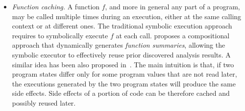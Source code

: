 \begin{itemize}

\item {\em Function caching.} A function $f$, and more in general any part of a program, may be called multiple times during an execution, either at the same calling context or at different ones. The traditional symbolic execution approach requires to symbolically execute $f$ at each call. \cite{G-POPL07} proposes a compositional approach that dynamically generates {\em function summaries}, allowing the symbolic executor to effectively reuse prior discovered analysis results. A similar idea has been also proposed in~\cite{BCE-TACAS08}. The main intuition is that, if two program states differ only for some program values that are not read later, the executions generated by the two program states will produce the same side effects. Side effects of a portion of code can be therefore cached and possibly reused later. 


\end{itemize}
